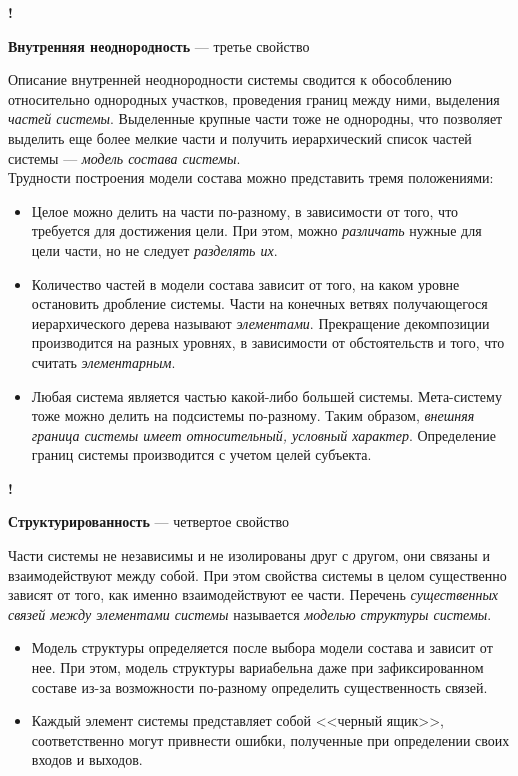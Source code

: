 \documentclass{article}
\newcommand{\note}[1]{\textit{#1}}
\newcommand{\define}[2]{
	\textbf{#1} --- #2
	}
\newcommand{\marked}[2]{
	\begin{flushright}\textbf{!}\hspace{2ex}\vline\hspace{2ex}
		\begin{minipage}{0.9\textwidth}
			\define{#1}{#2}
		\end{minipage}
	\end{flushright}
	}
\begin{document}
\marked{Внутренняя неоднородность}{третье свойство}
Описание внутренней неоднородности системы сводится к обособлению относительно однородных участков, проведения границ между ними, выделения \note{частей системы}. Выделенные крупные части тоже не однородны, что позволяет выделить еще более мелкие части и получить иерархический список частей системы --- \note{модель состава системы}.\\
Трудности построения модели состава можно представить тремя положениями:
\begin{itemize}
	\item Целое можно делить на части по-разному, в зависимости от того, что требуется для достижения цели. При этом, можно \note{различать} нужные для цели части, но не следует \note{разделять их}.
	\item Количество частей в модели состава зависит от того, на каком уровне остановить дробление системы. Части на конечных ветвях получающегося иерархического дерева называют \note{элементами}. Прекращение декомпозиции производится на разных уровнях, в зависимости от обстоятельств и того, что считать \note{элементарным}.
	\item Любая система является частью какой-либо большей системы. Мета-систему тоже можно делить на подсистемы по-разному. Таким образом, \note{внешняя граница системы имеет относительный, условный характер}. Определение границ системы производится с учетом целей субъекта.
\end{itemize}
\marked{Структурированность}{четвертое свойство}
Части системы не независимы и не изолированы друг с другом, они связаны и взаимодействуют между собой. При этом свойства системы в целом существенно зависят от того, как именно взаимодействуют ее части. Перечень \note{существенных связей между элементами системы} называется \note{моделью структуры системы}.
\begin{itemize}
	\item Модель структуры определяется после выбора модели состава и зависит от нее. При этом, модель структуры вариабельна даже при зафиксированном составе из-за возможности по-разному определить существенность связей.
	\item Каждый элемент системы представляет собой <<черный ящик>>, соответственно могут привнести ошибки, полученные при определении своих входов и выходов.
\end{itemize}
\end{document}
